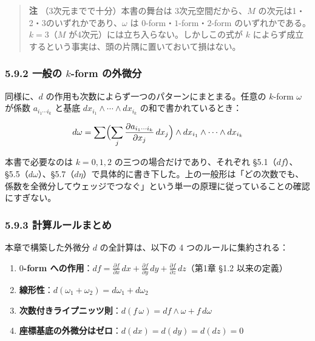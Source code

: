 \documentclass[a4paper,12pt,openany]{book}
\providecommand{\tightlist}{%
  \setlength{\itemsep}{0pt}\setlength{\parskip}{0pt}}
\begin{document}
\begin{quote}
\textbf{注} （3次元までで十分）本書の舞台は 3次元空間だから、\(M\)
の次元は1・2・3のいずれかであり、\(\omega\) は
\(0\)-form・\(1\)-form・\(2\)-form のいずれかである。\(k=3\)（\(M\)
が4次元）には立ち入らない。しかしこの式が \(k\)
によらず成立するという事実は、頭の片隅に置いておいて損はない。
\end{quote}

\hypertarget{ux4e00ux822cux306e-k-form-ux306eux5916ux5faeux5206}{%
\subsubsection{\texorpdfstring{5.9.2 一般の \(k\)-form
の外微分}{5.9.2 一般の k-form の外微分}}\label{ux4e00ux822cux306e-k-form-ux306eux5916ux5faeux5206}}

同様に、\(d\) の作用も次数によらず一つのパターンにまとまる。任意の
\(k\)-form \(\omega\) が係数 \(a_{i_1\cdots i_k}\) と基底
\(dx_{i_1}\wedge\cdots\wedge dx_{i_k}\) の和で書かれているとき：

\[d\omega = \sum \Bigl( \sum_j \frac{\partial a_{i_1\cdots i_k}}{\partial x_j}\,dx_j \Bigr) \wedge dx_{i_1}\wedge\cdots\wedge dx_{i_k}\]

本書で必要なのは \(k=0,1,2\) の三つの場合だけであり、それぞれ
§5.1（\(df\)）、§5.5（\(d\omega\)）、§5.7（\(d\eta\)）で具体的に書き下した。上の一般形は「どの次数でも、係数を全微分してウェッジでつなぐ」という単一の原理に従っていることの確認にすぎない。

\hypertarget{ux8a08ux7b97ux30ebux30fcux30ebux307eux3068ux3081}{%
\subsubsection{5.9.3
計算ルールまとめ}\label{ux8a08ux7b97ux30ebux30fcux30ebux307eux3068ux3081}}

本章で構築した外微分 \(d\) の全計算は、以下の 4 つのルールに集約される：

\begin{enumerate}
\def\labelenumi{\arabic{enumi}.}
\tightlist
\item
  \textbf{$0$-form への作用}：\(df = \frac{\partial f}{\partial x}\,dx + \frac{\partial f}{\partial y}\,dy + \frac{\partial f}{\partial z}\,dz\)（第1章
  §1.2 以来の定義）
\item
  \textbf{線形性}：\(d(\omega_1 + \omega_2) = d\omega_1 + d\omega_2\)
\item
  \textbf{次数付きライプニッツ則}：\(d(f\,\omega) = df \wedge \omega + f\,d\omega\)
\item
  \textbf{座標基底の外微分はゼロ}：\(d(dx) = d(dy) = d(dz) = 0\)
\end{enumerate}
\end{document}
